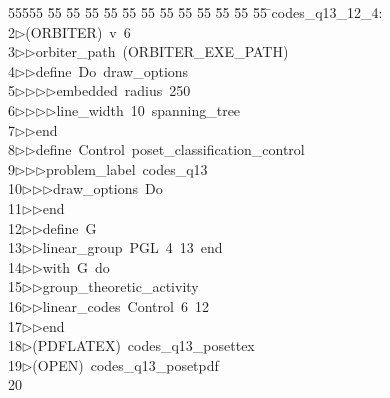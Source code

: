 %
%
\begin{tabbing}
55555 \= 55 \= 55 \= 55 \= 55 \= 55 \= 55 \= 55 \= 55 \= 55 \= 55 \= 55 \= 55 \= \>codes\_q13\_12\_4:\\[0pt]
2\>$\triangleright$\>(ORBITER)\ v\ 6\ \\[0pt]
3\>$\triangleright$\>$\triangleright$\>orbiter\_path\ (ORBITER\_EXE\_PATH)\ \\[0pt]
4\>$\triangleright$\>$\triangleright$\>define\ Do\ draw\_options\ \\[0pt]
5\>$\triangleright$\>$\triangleright$\>$\triangleright$\>$\triangleright$\>embedded\ radius\ 250\ \\[0pt]
6\>$\triangleright$\>$\triangleright$\>$\triangleright$\>$\triangleright$\>line\_width\ 10\ spanning\_tree\ \\[0pt]
7\>$\triangleright$\>$\triangleright$\>end\ \\[0pt]
8\>$\triangleright$\>$\triangleright$\>define\ Control\ poset\_classification\_control\ \\[0pt]
9\>$\triangleright$\>$\triangleright$\>$\triangleright$\>problem\_label\ codes\_q13\ \\[0pt]
10\>$\triangleright$\>$\triangleright$\>$\triangleright$\>draw\_options\ Do\ \\[0pt]
11\>$\triangleright$\>$\triangleright$\>end\ \\[0pt]
12\>$\triangleright$\>$\triangleright$\>define\ G\ \\[0pt]
13\>$\triangleright$\>$\triangleright$\>linear\_group\ PGL\ 4\ 13\ end\ \\[0pt]
14\>$\triangleright$\>$\triangleright$\>with\ G\ do\ \\[0pt]
15\>$\triangleright$\>$\triangleright$\>group\_theoretic\_activity\ \\[0pt]
16\>$\triangleright$\>$\triangleright$\>linear\_codes\ Control\ 6\ 12\ \\[0pt]
17\>$\triangleright$\>$\triangleright$\>end\\[0pt]
18\>$\triangleright$\>(PDFLATEX)\ codes\_q13\_posettex\\[0pt]
19\>$\triangleright$\>(OPEN)\ codes\_q13\_posetpdf\\[0pt]
20\>\end{tabbing}
